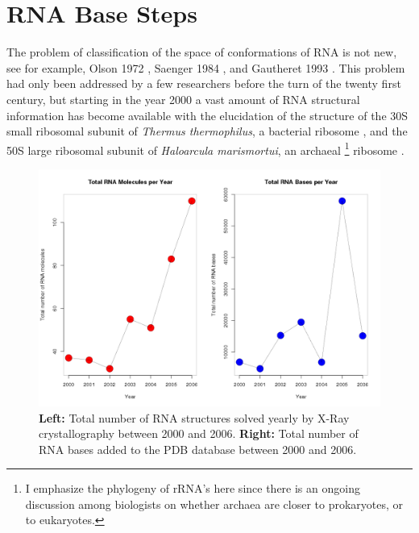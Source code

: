 \chapter{RNA Base Steps}
\label{basesteps} 

The problem of classification of the space of conformations
of  RNA is  not new,  see  for example,  Olson 1972  \cite{olson1972},
Saenger     1984     \cite{saenger1984},     and    Gautheret     1993
\cite{gautheret1993}.  This problem  had  only been  addressed by  a few
researchers before the  turn of the twenty first century,  but starting in
the year 2000  a vast amount of RNA  structural information has become
available  with the  elucidation of  the  structure of  the 30S  small
ribosomal  subunit  of   \textit{Thermus  thermophilus},  a  bacterial
ribosome   \cite{wimberly2000,schluenzen2000},  and   the   50S  large
ribosomal subunit of \textit{Haloarcula marismortui}, an archaeal
\footnote{I emphasize the  phylogeny of rRNA's here since  there is an
  ongoing discussion among biologists on whether archaea are  closer
  to prokaryotes, or to eukaryotes.}  ribosome \cite{ban2000}.

\begin{figure}[H]
\centering
\includegraphics[scale=0.4]{Chapter2/rna_per_year.png}
\caption{\textbf{Left:} Total number of RNA structures solved yearly by X-Ray 
crystallography between 2000 and 2006. \textbf{Right:} Total number of 
RNA bases added to the PDB database between 2000 and 2006.}
\label{fig:rnainpdb}
\end{figure}

